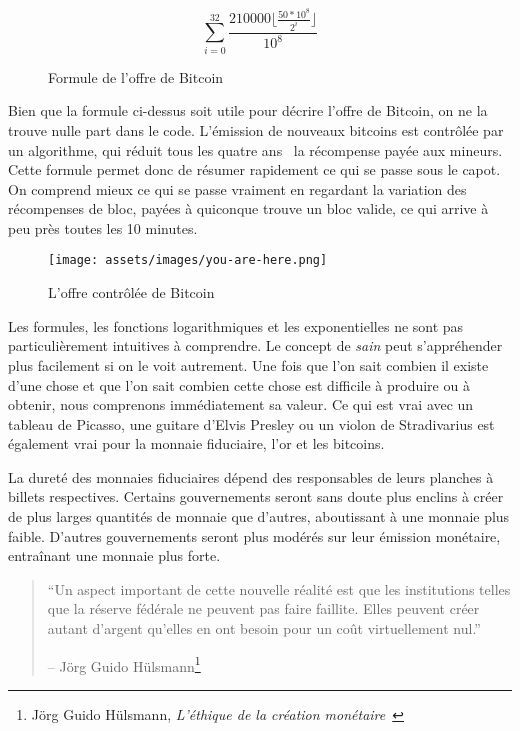 \begin{figure}
  \centering
  \begin{equation}
  \sum\limits_{i=0}^{32} \frac{210000 \lfloor \frac{50*10^8}{2^i} \rfloor}{10^8}
  \end{equation}
  \caption{Formule de l'offre de Bitcoin}
  \label{fig:supply-formula-white}
\end{figure}

Bien que la formule ci-dessus soit utile pour décrire l'offre de Bitcoin, on ne
la trouve nulle part dans le code. L'émission de nouveaux bitcoins est contrôlée
par un algorithme, qui réduit tous les quatre ans~\cite{btcwiki:supply} la
récompense payée aux mineurs. Cette formule permet donc de résumer rapidement ce
qui se passe sous le capot. On comprend mieux ce qui se passe vraiment en
regardant la variation des récompenses de bloc, payées à quiconque trouve un
bloc valide, ce qui arrive à peu près toutes les 10 minutes.

\begin{figure}
  \texttt{[image: assets/images/you-are-here.png]}
  \caption{L'offre contrôlée de Bitcoin}
  \label{fig:you-are-here.png}
\end{figure}

Les formules, les fonctions logarithmiques et les exponentielles ne sont pas
particulièrement intuitives à comprendre. Le concept de \textit{sain} peut
s'appréhender plus facilement si on le voit autrement. Une fois que l'on sait
combien il existe d'une chose et que l'on sait combien cette chose est
difficile à produire ou à obtenir, nous comprenons immédiatement sa valeur. Ce
qui est vrai avec un tableau de Picasso, une guitare d'Elvis Presley ou un
violon de Stradivarius est également vrai pour la monnaie fiduciaire, l'or et
les bitcoins. 

La dureté des monnaies fiduciaires dépend des responsables de leurs planches à
billets respectives. Certains gouvernements seront sans doute plus enclins à
créer de plus larges quantités de monnaie que d'autres, aboutissant à une
monnaie plus faible. D'autres gouvernements seront plus modérés sur leur
émission monétaire, entraînant une monnaie plus forte.

\begin{samepage}\begin{quotation}
\enquote{Un aspect important de cette nouvelle réalité est que les institutions
telles que la réserve fédérale ne peuvent pas faire faillite. Elles peuvent
créer autant d'argent qu'elles en ont besoin pour un coût virtuellement nul.}
\begin{flushright} -- Jörg Guido Hülsmann\footnote{Jörg Guido Hülsmann,
\textit{L'éthique de la création monétaire}~\cite{hulsmann2008ethics}}
\end{flushright}\end{quotation}\end{samepage}

